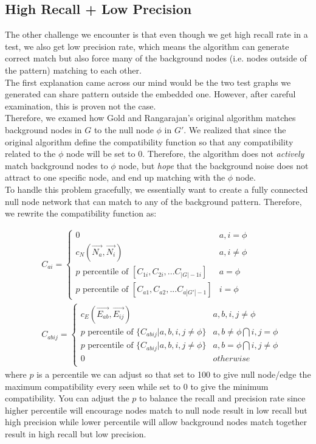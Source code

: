 \subsection{High Recall + Low Precision}

The other challenge we encounter is that even though we get high recall rate in a test, we also get low precision rate, which means the algorithm can generate correct match but also force many of the background nodes (i.e. nodes outside of the pattern) matching  to each other.\\

The first explanation came across our mind would be the two test graphs we generated can share pattern outside the embedded one. However, after careful examination, this is proven not the case.\\

Therefore, we examed how Gold and Rangarajan's original algorithm matches background nodes in $G$ to the null node $\phi$ in $G'$. We realized that since the original algorithm define the compatibility function so that any compatibility related to the $\phi$ node will be set to 0. Therefore, the algorithm does not \emph{actively} match background nodes to  $\phi$ node, but \emph{hope} that the background noise does not attract to one specific node, and end up matching with the $\phi$ node.\\

To handle this problem gracefully, we essentially want to create a fully connected null node network that can match to any of the background pattern. Therefore, we rewrite the compatibility function as:

\begin{align} 
& C_{ai}  = \begin{cases}
0 & a,i=\phi \\
c_N(\overrightarrow{N_{a}},\overrightarrow{N_{i}}) & a, i\neq\phi \\
p \text{ percentile of }[C_{1i}, C_{2i},...C_{|G|-1i}] & a=\phi\\
p \text{ percentile of }[C_{a1}, C_{a2},...C_{a|G'|-1}] & i=\phi
\end{cases}\\
& C_{abij} = \begin{cases}
c_E(\overrightarrow{E_{ab}},\overrightarrow{E_{ij}})  & a,b,i,j\neq\phi \\
p \text{ percentile of }\{C_{abij}|a,b,i,j\neq\phi\} & a,b\neq\phi \bigcap i,j=\phi\\
p \text{ percentile of }\{C_{abij}|a,b,i,j\neq\phi\} & a,b=\phi \bigcap i,j\neq\phi\\
0 & otherwise\\
\end{cases}
\end{align}
where $p$ is a percentile we can adjust so that set to 100 to give null node/edge the maximum compatibility every seen while set to 0 to give the minimum compatibility. You can adjust the $p$ to balance the recall and precision rate since higher percentile will encourage nodes match to null node result in low recall but high precision while lower percentile will allow background nodes match together result in high recall but low precision.\\

